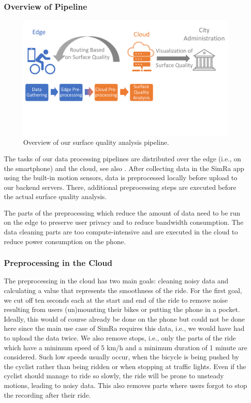 \subsubsection{Overview of Pipeline}
\label{subsubsec:overview_of_pipeline}
\begin{figure}
    \centering
    \includegraphics[width=\columnwidth]{fig/overview.pdf}
    \caption{%
        Overview of our surface quality analysis pipeline.
    }%
    \label{fig:overview}
\end{figure}
The tasks of our data processing pipelines are distributed over the edge (i.e., on the smartphone) and the cloud, see also .
After collecting data in the SimRa app using the built-in motion sensors, data is preprocessed locally before upload to our backend servers.
There, additional preprocessing steps are executed before the actual surface quality analysis.

The parts of the preprocessing which reduce the amount of data need to be run on the edge to preserve user privacy and to reduce bandwidth consumption.
The data cleaning parts are too compute-intensive and are executed in the cloud to reduce power consumption on the phone.

\subsubsection{Preprocessing in the Cloud}
\label{subsubsec:preprocessing_in_the_cloud}
The preprocessing in the cloud has two main goals: cleaning noisy data and calculating a value that represents the smoothness of the ride.
For the first goal, we cut off ten seconds each at the start and end of the ride to remove noise resulting from users (un)mounting their bikes or putting the phone in a pocket.
Ideally, this would of course already be done on the phone but could not be done here since the main use case of SimRa requires this data, i.e., we would have had to upload the data twice.
We also remove stops, i.e., only the parts of the ride which have a minimum speed of 5 km/h and a minimum duration of 1 minute are considered.
Such low speeds usually occur, when the bicycle is being pushed by the cyclist rather than being ridden or when stopping at traffic lights.
Even if the cyclist should manage to ride so slowly, the ride will be prone to unsteady motions, leading to noisy data.
This also removes parts where users forgot to stop the recording after their ride.


